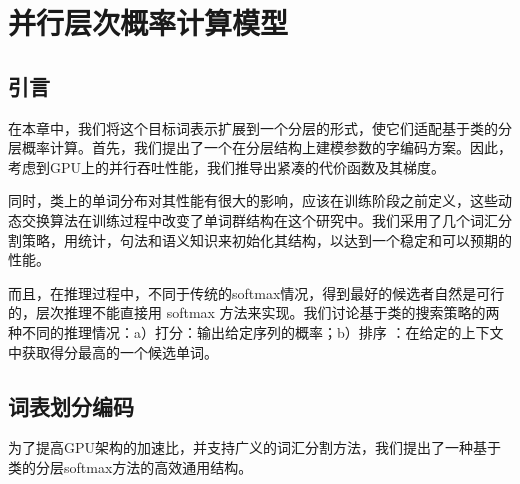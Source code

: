 \chapter{并行层次概率计算模型}
\section{引言}
在本章中，我们将这个目标词表示扩展到一个分层的形式，使它们适配基于类的分层概率计算。首先，我们提出了一个在分层结构上建模参数的字编码方案。因此，考虑到GPU上的并行吞吐性能，我们推导出紧凑的代价函数及其梯度。

同时，类上的单词分布对其性能有很大的影响，应该在训练阶段之前定义，这些动态交换算法在训练过程中改变了单词群结构在这个研究中。我们采用了几个词汇分割策略，用统计，句法和语义知识来初始化其结构，以达到一个稳定和可以预期的性能。

而且，在推理过程中，不同于传统的softmax情况，得到最好的候选者自然是可行的，层次推理不能直接用 softmax 方法来实现。我们讨论基于类的搜索策略的两种不同的推理情况：a）打分：输出给定序列的概率；b）排序   ：在给定的上下文中获取得分最高的一个候选单词。
\section{词表划分编码}
为了提高GPU架构的加速比，并支持广义的词汇分割方法，我们提出了一种基于类的分层softmax方法的高效通用结构。

